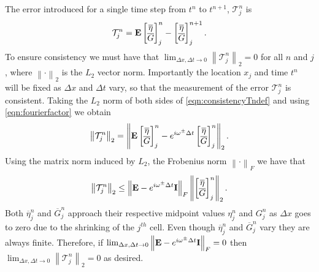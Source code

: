 The error introduced for a single time step from $t^n$ to $t^{n+1}$, $\mathcal{T}^n_j$ is
\begin{equation}
\mathcal{T}^n_j =  \mathbf{E}\begin{bmatrix}
\overline{\eta} \\ \overline{G}
\end{bmatrix}^{n}_j -  \begin{bmatrix}
\overline{\eta} \\ \overline{G}
\end{bmatrix}^{n+1}_j.
\label{eqn:consistencyTndef}
\end{equation}
To ensure consistency we must have that $ \lim_{\Delta x,\Delta t \rightarrow 0}\left \| \mathcal{T}^n_j \right \|_2 = 0 $ for all $n$ and $j$, where $\left \|  \cdot\right\|_2$ is the $L_2$ vector norm. Importantly the location $x_j$ and time $t^n$ will be fixed as $\Delta x$ and $\Delta t$ vary, so that the measurement of the error $\mathcal{T}^n_j$ is consistent. Taking the $L_2$ norm of both sides of \eqref{eqn:consistencyTndef} and using \eqref{eqn:fourierfactor}  we obtain
\begin{equation*}
\left \|\mathcal{T}^n_j \right \|_2 = \left \|  \mathbf{E}\begin{bmatrix}
\overline{\eta} \\ \overline{G}
\end{bmatrix}^{n}_j -  e^{i \omega^\pm \Delta t} \begin{bmatrix}
\overline{\eta} \\ \overline{G}
\end{bmatrix}^{n}_j \right \|_2.
\end{equation*}
Using the matrix norm induced by $L_2$, the Frobenius norm $\left \|  \cdot\right\|_F$ we have that
\begin{equation*}
\left \|\mathcal{T}^n_j \right \|_2  \le \left \| \mathbf{E} -  e^{i \omega^\pm \Delta t}\mathbf{I} \right \|_F \left \| \begin{bmatrix}
\overline{\eta} \\ \overline{G}
\end{bmatrix}^{n}_j\right \|_2.
\end{equation*}
Both $\overline{\eta}^n_j$ and $\overline{G}^n_j$ approach their respective midpoint values ${\eta}^n_j$ and ${G}^n_j$ as $\Delta x$ goes to zero due to the shrinking of the $j^{th}$ cell. Even though $\overline{\eta}^n_j$ and  $\overline{G}^n_j$ vary they are always finite. Therefore, if $ \lim_{\Delta x,\Delta t \rightarrow 0} \left\| \mathbf{E} -  e^{i \omega^\pm \Delta t}\mathbf{I} \right\|_F = 0 $ then $ \lim_{\Delta x,\Delta t \rightarrow 0}\left \|\mathcal{T}^n_j \right \|_2 = 0 $ as desired.

